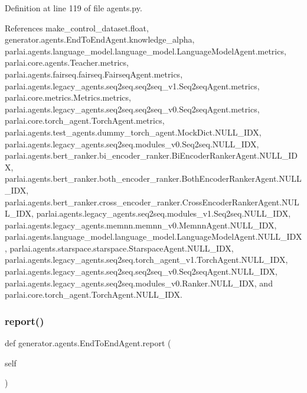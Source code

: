 Definition at line 119 of file agents.\+py.



References make\+\_\+control\+\_\+dataset.\+float, generator.\+agents.\+End\+To\+End\+Agent.\+knowledge\+\_\+alpha, parlai.\+agents.\+language\+\_\+model.\+language\+\_\+model.\+Language\+Model\+Agent.\+metrics, parlai.\+core.\+agents.\+Teacher.\+metrics, parlai.\+agents.\+fairseq.\+fairseq.\+Fairseq\+Agent.\+metrics, parlai.\+agents.\+legacy\+\_\+agents.\+seq2seq.\+seq2seq\+\_\+v1.\+Seq2seq\+Agent.\+metrics, parlai.\+core.\+metrics.\+Metrics.\+metrics, parlai.\+agents.\+legacy\+\_\+agents.\+seq2seq.\+seq2seq\+\_\+v0.\+Seq2seq\+Agent.\+metrics, parlai.\+core.\+torch\+\_\+agent.\+Torch\+Agent.\+metrics, parlai.\+agents.\+test\+\_\+agents.\+dummy\+\_\+torch\+\_\+agent.\+Mock\+Dict.\+N\+U\+L\+L\+\_\+\+I\+DX, parlai.\+agents.\+legacy\+\_\+agents.\+seq2seq.\+modules\+\_\+v0.\+Seq2seq.\+N\+U\+L\+L\+\_\+\+I\+DX, parlai.\+agents.\+bert\+\_\+ranker.\+bi\+\_\+encoder\+\_\+ranker.\+Bi\+Encoder\+Ranker\+Agent.\+N\+U\+L\+L\+\_\+\+I\+DX, parlai.\+agents.\+bert\+\_\+ranker.\+both\+\_\+encoder\+\_\+ranker.\+Both\+Encoder\+Ranker\+Agent.\+N\+U\+L\+L\+\_\+\+I\+DX, parlai.\+agents.\+bert\+\_\+ranker.\+cross\+\_\+encoder\+\_\+ranker.\+Cross\+Encoder\+Ranker\+Agent.\+N\+U\+L\+L\+\_\+\+I\+DX, parlai.\+agents.\+legacy\+\_\+agents.\+seq2seq.\+modules\+\_\+v1.\+Seq2seq.\+N\+U\+L\+L\+\_\+\+I\+DX, parlai.\+agents.\+legacy\+\_\+agents.\+memnn.\+memnn\+\_\+v0.\+Memnn\+Agent.\+N\+U\+L\+L\+\_\+\+I\+DX, parlai.\+agents.\+language\+\_\+model.\+language\+\_\+model.\+Language\+Model\+Agent.\+N\+U\+L\+L\+\_\+\+I\+DX, parlai.\+agents.\+starspace.\+starspace.\+Starspace\+Agent.\+N\+U\+L\+L\+\_\+\+I\+DX, parlai.\+agents.\+legacy\+\_\+agents.\+seq2seq.\+torch\+\_\+agent\+\_\+v1.\+Torch\+Agent.\+N\+U\+L\+L\+\_\+\+I\+DX, parlai.\+agents.\+legacy\+\_\+agents.\+seq2seq.\+seq2seq\+\_\+v0.\+Seq2seq\+Agent.\+N\+U\+L\+L\+\_\+\+I\+DX, parlai.\+agents.\+legacy\+\_\+agents.\+seq2seq.\+modules\+\_\+v0.\+Ranker.\+N\+U\+L\+L\+\_\+\+I\+DX, and parlai.\+core.\+torch\+\_\+agent.\+Torch\+Agent.\+N\+U\+L\+L\+\_\+\+I\+DX.

\mbox{\label{classgenerator_1_1agents_1_1EndToEndAgent_a761044b6ad7410f5feb13e4231f60ce3}} 
\subsubsection{\texorpdfstring{report()}{report()}}
{\footnotesize\ttfamily def generator.\+agents.\+End\+To\+End\+Agent.\+report (\begin{DoxyParamCaption}\item[{}]{self }\end{DoxyParamCaption})}




